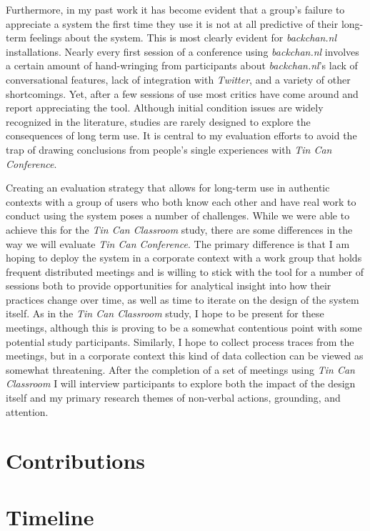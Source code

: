 \documentclass{tufte-handout}
\begin{document}
Furthermore, in my past work it has become evident that a group's failure to appreciate a system the first time they use it is not at all predictive of their long-term feelings about the system. This is most clearly evident for \emph{backchan.nl} installations. Nearly every first session of a conference using \emph{backchan.nl} involves a certain amount of hand-wringing from participants about \emph{backchan.nl}'s lack of conversational features, lack of integration with \emph{Twitter}, and a variety of other shortcomings. Yet, after a few sessions of use most critics have come around and report appreciating the tool. Although initial condition issues are widely recognized in the literature, studies are rarely designed to explore the consequences of long term use. It is central to my evaluation efforts to avoid the trap of drawing conclusions from people's single experiences with \emph{Tin Can Conference}.

Creating an evaluation strategy that allows for long-term use in authentic contexts with a group of users who both know each other and have real work to conduct using the system poses a number of challenges. While we were able to achieve this for the \emph{Tin Can Classroom} study, there are some differences in the way we will evaluate \emph{Tin Can Conference}. The primary difference is that I am hoping to deploy the system in a corporate context with a work group that holds frequent distributed meetings and is willing to stick with the tool for a number of sessions both to provide opportunities for analytical insight into how their practices change over time, as well as time to iterate on the design of the system itself. As in the \emph{Tin Can Classroom} study, I hope to be present for these meetings, although this is proving to be a somewhat contentious point with some potential study participants. Similarly, I hope to collect process traces from the meetings, but in a corporate context this kind of data collection can be viewed as somewhat threatening. After the completion of a set of meetings using \emph{Tin Can Classroom} I will interview participants to explore both the impact of the design itself and my primary research themes of non-verbal actions, grounding, and attention.



\section{Contributions}

\section{Timeline}





\end{document}
